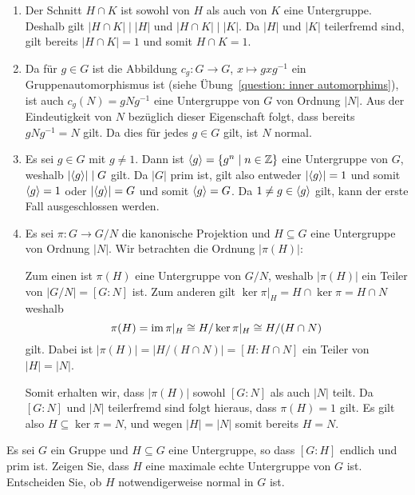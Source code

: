 \begin{solution}
  \begin{enumerate}
    \item
      Der Schnitt $H \cap K$ ist sowohl von $H$ als auch von $K$ eine Untergruppe.
      Deshalb gilt $|H \cap K| \mid |H|$ und $|H \cap K| \mid |K|$.
      Da $|H|$ und $|K|$ teilerfremd sind, gilt bereits $|H \cap K| = 1$ und somit $H \cap K = 1$.
      
    \item
      Da für $g \in G$ ist die Abbildung $c_g \colon G \to G$, $x \mapsto gxg^{-1}$ ein Gruppenautomorphismus ist (siehe Übung~\ref{question: inner automorphims}), ist auch $c_g(N) = gNg^{-1}$ eine Untergruppe von $G$ von Ordnung $|N|$.
      Aus der Eindeutigkeit von $N$ bezüglich dieser Eigenschaft folgt, dass bereits $g N g^{-1} = N$ gilt.
      Da dies für jedes $g \in G$ gilt, ist $N$ normal.
    
    \item
      Es sei $g \in G$ mit $g \neq 1$.
      Dann ist $\langle g\rangle = \{g^n \mid n \in \mathbb{Z}\}$ eine Untergruppe von $G$, weshalb $|{\langle g\rangle}| \mid G$ gilt.
      Da $|G|$ prim ist, gilt also entweder $|{\langle g\rangle}| = 1$ und somit $\langle g\rangle = 1$ oder $|{\langle g\rangle}| = G$ und somit $\langle g\rangle = G$.
      Da $1 \neq g \in \langle g\rangle$ gilt, kann der erste Fall ausgeschlossen werden.
    
    \item
      Es sei $\pi \colon G \to G/N$ die kanonische Projektion und $H \subseteq G$ eine Untergruppe von Ordnung $|N|$.
      Wir betrachten die Ordnung $|\pi(H)|$:
      
      Zum einen ist $\pi(H)$ eine Untergruppe von $G/N$, weshalb $|\pi(H)|$ ein Teiler von $|G/N| = [G : N]$ ist.
      Zum anderen gilt $\ker \pi|_H = H \cap \ker \pi = H \cap N$ weshalb
      \[
        \pi(H) = \operatorname{im} \pi|_H \cong H / \ker \pi|_H \cong H / (H \cap N)
      \]
      gilt.
      Dabei ist $|\pi(H)| = |H/(H \cap N)| = [H : H \cap N]$ ein Teiler von $|H| = |N|$.
      
      Somit erhalten wir, dass $|\pi(H)|$ sowohl $[G : N]$ als auch $|N|$ teilt.
      Da $[G : N]$ und $|N|$ teilerfremd sind folgt hieraus, dass $\pi(H) = 1$ gilt.
      Es gilt also $H \subseteq \ker \pi = N$, und wegen $|H| = |N|$ somit bereits $H = N$.
  \end{enumerate}
\end{solution}


\begin{question}[subtitle = Ein Kriterium für maximale Untergruppen]
  Es sei $G$ ein Gruppe und $H \subseteq G$ eine Untergruppe, so dass $[G : H]$ endlich und prim ist.
  Zeigen Sie, dass $H$ eine maximale echte Untergruppe von $G$ ist. Entscheiden Sie, ob $H$ notwendigerweise normal in $G$ ist.
\end{question}


